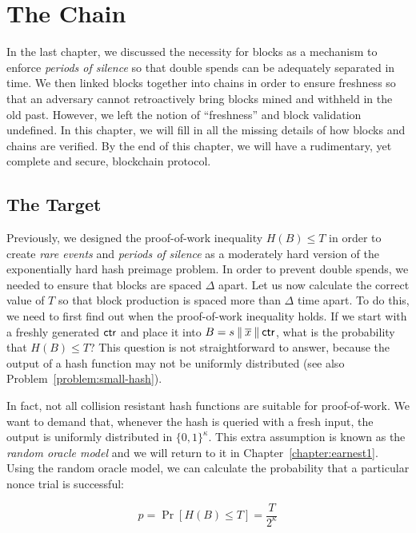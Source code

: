 \chapter{The Chain}\label{chapter:chain}

In the last chapter, we discussed the necessity for blocks as a mechanism to enforce \emph{periods of silence} so that double spends
can be adequately separated in time.  We then linked blocks together into chains in order to ensure freshness so that an adversary cannot
retroactively bring blocks mined and withheld in the old past. However, we left the notion of ``freshness'' and block validation
undefined. In this chapter, we will fill in all the missing details of how blocks and chains are verified. By the end of this chapter,
we will have a rudimentary, yet complete and secure, blockchain protocol.

\section{The Target}

Previously, we designed the proof-of-work inequality $H(B) \leq T$ in order to create \emph{rare events} and \emph{periods of silence}
as a moderately hard version of the exponentially hard hash preimage problem. In order to prevent double spends, we needed to ensure
that blocks are spaced $\Delta$ apart. Let us now calculate the correct value of $T$ so that block production is spaced more than
$\Delta$ time apart. To do this, we need to first find out when the proof-of-work inequality holds. If we start
with a freshly generated $\mathsf{ctr}$ and place it into $B = s \mathbin{\|} \overline{x} \mathbin{\|} \mathsf{ctr}$, what is the probability that $H(B) \leq T$?
This question is not straightforward to answer, because the output of a hash function may not be uniformly distributed (see also
Problem~\ref{problem:small-hash}).

In fact, not all collision resistant hash functions are suitable for proof-of-work. We want to demand that, whenever the hash is queried with a fresh input, the output is uniformly distributed in $\{0,1\}^\kappa$. This extra assumption is known as the \emph{random oracle model} and we will return to it in Chapter~\ref{chapter:earnest1}. Using the random oracle model, we can calculate the probability that a particular nonce trial is successful:

\[
  p = \Pr[H(B) \leq T] = \frac{T}{2^\kappa}
\]

